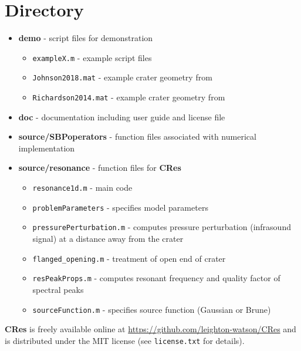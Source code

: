 \documentclass[10pt]{article}
\begin{document}
\section{Directory}
\begin{itemize}
\item {\bf demo} - script files for demonstration
\begin{itemize}
\item \texttt{exampleX.m} - example script files
\item \texttt{Johnson2018.mat} - example crater geometry from \citet{Johnson2018}
\item \texttt{Richardson2014.mat} - example crater geometry from \citet{Richardson2014}
\end{itemize}

\item {\bf doc} - documentation including user guide and license file
\item{\bf source/SBPoperators} - function files associated with numerical implementation
\item {\bf source/resonance} - function files for {\bf CRes}
\begin{itemize}
\item \texttt{resonance1d.m} - main code
\item \texttt{problemParameters} - specifies model parameters
\item \texttt{pressurePerturbation.m} - computes pressure perturbation (infrasound signal) at a distance away from the crater
\item \texttt{flanged\_opening.m} - treatment of open end of crater
\item \texttt{resPeakProps.m} - computes resonant frequency and quality factor of spectral peaks
\item \texttt{sourceFunction.m} - specifies source function (Gaussian or Brune)
\end{itemize}
\end{itemize}

{\bf CRes} is freely available online at \href{https://github.com/leighton-watson/CRes}{https://github.com/leighton-watson/CRes} and is distributed under the MIT license (see \texttt{license.txt} for details). 

\end{document}
